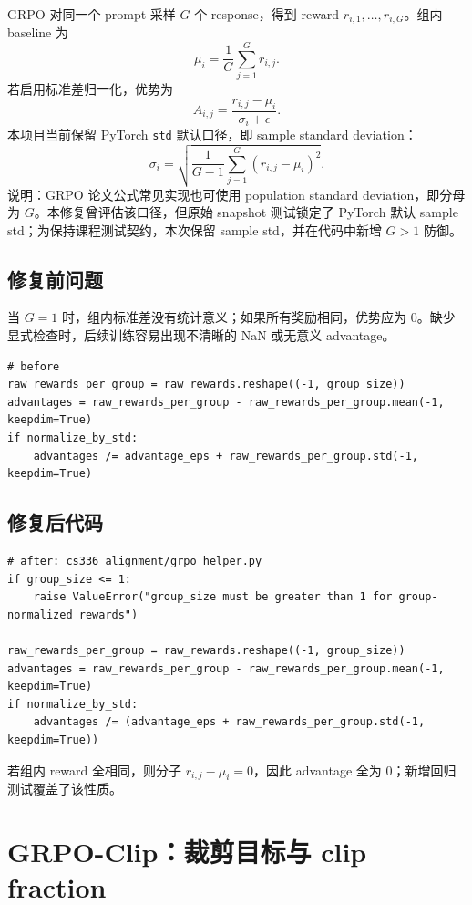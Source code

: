 \documentclass[UTF8,a4paper,11pt]{ctexart}
\begin{document}
GRPO 对同一个 prompt 采样 $G$ 个 response，得到 reward $r_{i,1},\dots,r_{i,G}$。组内 baseline 为
\[
  \mu_i = \frac{1}{G}\sum_{j=1}^{G}r_{i,j}.
\]
若启用标准差归一化，优势为
\[
  A_{i,j}
  =
  \frac{r_{i,j}-\mu_i}{\sigma_i+\epsilon}.
\]
本项目当前保留 PyTorch \texttt{std} 默认口径，即 sample standard deviation：
\[
  \sigma_i
  =
  \sqrt{\frac{1}{G-1}\sum_{j=1}^{G}(r_{i,j}-\mu_i)^2}.
\]
说明：GRPO 论文公式常见实现也可使用 population standard deviation，即分母为 $G$。本修复曾评估该口径，但原始 snapshot 测试锁定了 PyTorch 默认 sample std；为保持课程测试契约，本次保留 sample std，并在代码中新增 $G>1$ 防御。

\subsection{修复前问题}

当 $G=1$ 时，组内标准差没有统计意义；如果所有奖励相同，优势应为 0。缺少显式检查时，后续训练容易出现不清晰的 NaN 或无意义 advantage。

\begin{lstlisting}
# before
raw_rewards_per_group = raw_rewards.reshape((-1, group_size))
advantages = raw_rewards_per_group - raw_rewards_per_group.mean(-1, keepdim=True)
if normalize_by_std:
    advantages /= advantage_eps + raw_rewards_per_group.std(-1, keepdim=True)
\end{lstlisting}

\subsection{修复后代码}

\begin{lstlisting}
# after: cs336_alignment/grpo_helper.py
if group_size <= 1:
    raise ValueError("group_size must be greater than 1 for group-normalized rewards")

raw_rewards_per_group = raw_rewards.reshape((-1, group_size))
advantages = raw_rewards_per_group - raw_rewards_per_group.mean(-1, keepdim=True)
if normalize_by_std:
    advantages /= (advantage_eps + raw_rewards_per_group.std(-1, keepdim=True))
\end{lstlisting}

若组内 reward 全相同，则分子 $r_{i,j}-\mu_i=0$，因此 advantage 全为 0；新增回归测试覆盖了该性质。

\section{GRPO-Clip：裁剪目标与 clip fraction}
\end{document}
